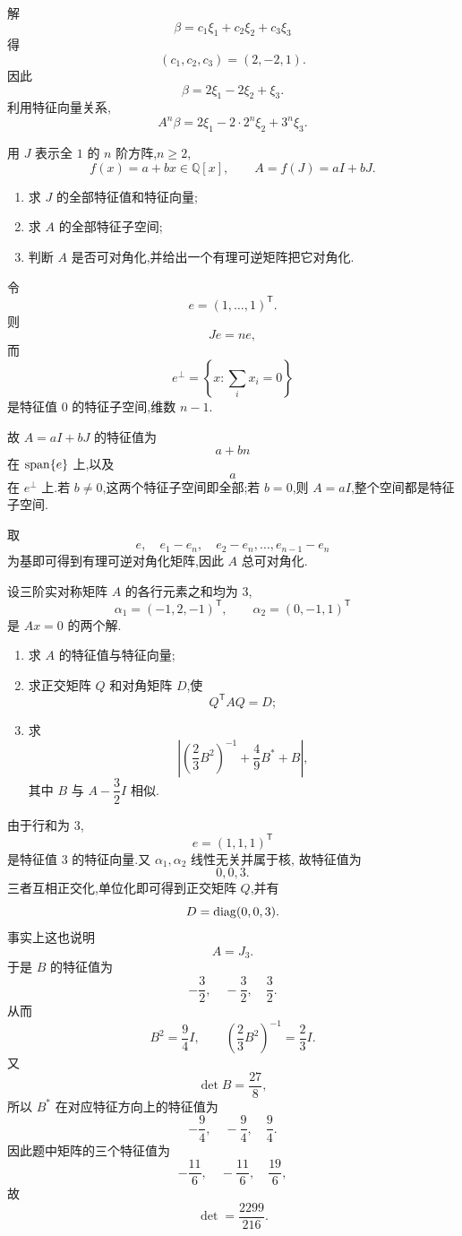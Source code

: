 \begin{solution}
解
\[
\beta=c_1\xi_1+c_2\xi_2+c_3\xi_3
\]
得
\[
(c_1,c_2,c_3)=(2,-2,1).
\]
因此
\[
\boxed{
\beta=2\xi_1-2\xi_2+\xi_3
}.
\]
利用特征向量关系,
\[
\boxed{
A^n\beta
=
2\xi_1-2\cdot2^n\xi_2+3^n\xi_3.
}
\]
\end{solution}


\begin{example}
用 $J$ 表示全 $1$ 的 $n$ 阶方阵,$n\geq2$,
\[
f(x)=a+bx\in\mathbb{Q}[x],
\qquad
A=f(J)=aI+bJ.
\]
\begin{enumerate}
    \item 求 $J$ 的全部特征值和特征向量;
    \item 求 $A$ 的全部特征子空间;
    \item 判断 $A$ 是否可对角化,并给出一个有理可逆矩阵把它对角化.
\end{enumerate}
\end{example}
\exampleblank

\begin{solution}
令
\[
e=(1,\ldots,1)^{\mathsf T}.
\]
则
\[
Je=ne,
\]
而
\[
e^\perp=\left\{x:\sum\limits_i x_i=0\right\}
\]
是特征值 $0$ 的特征子空间,维数 $n-1$.

故 $A=aI+bJ$ 的特征值为
\[
a+bn
\]
在 $\operatorname{span}\{e\}$ 上,以及
\[
a
\]
在 $e^\perp$ 上.若 $b\neq0$,这两个特征子空间即全部;若 $b=0$,则
$A=aI$,整个空间都是特征子空间.

取
\[
e,\quad e_1-e_n,\quad e_2-e_n,\ldots,e_{n-1}-e_n
\]
为基即可得到有理可逆对角化矩阵,因此 $A$ 总可对角化.
\end{solution}


\begin{example}
设三阶实对称矩阵 $A$ 的各行元素之和均为 $3$,
\[
\alpha_1=(-1,2,-1)^{\mathsf T},
\qquad
\alpha_2=(0,-1,1)^{\mathsf T}
\]
是 $Ax=0$ 的两个解.
\begin{enumerate}
    \item 求 $A$ 的特征值与特征向量;
    \item 求正交矩阵 $Q$ 和对角矩阵 $D$,使
    \[
    Q^{\mathsf T}AQ=D;
    \]
    \item 求
    \[
    \left|
    \left(\dfrac23B^2\right)^{-1}
    +\dfrac49B^*
    +B
    \right|,
    \]
    其中 $B$ 与 $A-\dfrac32I$ 相似.
\end{enumerate}
\end{example}
\exampleblank

\begin{solution}
由于行和为 $3$,
\[
e=(1,1,1)^{\mathsf T}
\]
是特征值 $3$ 的特征向量.又 $\alpha_1,\alpha_2$ 线性无关并属于核,
故特征值为
\[
\boxed{0,0,3}.
\]
三者互相正交化,单位化即可得到正交矩阵 $Q$,并有
\[
D=\operatorname{diag}(0,0,3).
\]
事实上这也说明
\[
A=J_3.
\]
于是 $B$ 的特征值为
\[
-\dfrac32,\quad-\dfrac32,\quad\dfrac32.
\]
从而
\[
B^2=\dfrac94I,
\qquad
\left(\dfrac23B^2\right)^{-1}=\dfrac23I.
\]
又
\[
\det B=\dfrac{27}{8},
\]
所以 $B^*$ 在对应特征方向上的特征值为
\[
-\dfrac94,\quad-\dfrac94,\quad\dfrac94.
\]
因此题中矩阵的三个特征值为
\[
-\dfrac{11}{6},\quad
-\dfrac{11}{6},\quad
\dfrac{19}{6},
\]
故
\[
\boxed{
\det
=
\dfrac{2299}{216}.
}
\]
\end{solution}



